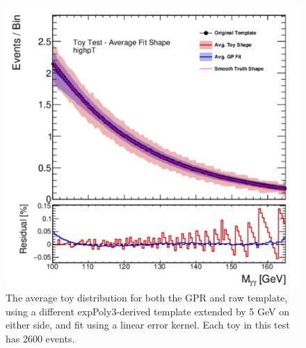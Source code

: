 \begin{figure} 
\begin{center}
  \includegraphics[width=\textwidth]{figures/background/gpr/validation/linear/ToyTest_AvgFitShape_highpT_2600_noSig}   
\caption{The average toy distribution for both the GPR and raw template, using a different expPoly3-derived template extended by 5 GeV on either side, and fit using a linear error kernel. Each toy in this test has 2600 events.}
\label{fig:linearkernel_highpt_2600_noSig}
\end{center}
\end{figure}

